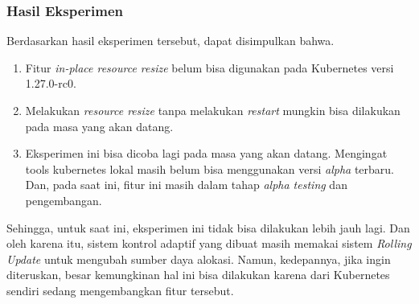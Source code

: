 \subsubsection{Hasil Eksperimen}

Berdasarkan hasil eksperimen tersebut, dapat disimpulkan bahwa.

\begin{enumerate}
    \item Fitur \textit{in-place resource resize} belum bisa digunakan pada Kubernetes versi 1.27.0-rc0.
    \item Melakukan \textit{resource resize} tanpa melakukan \textit{restart} mungkin bisa dilakukan pada masa yang akan datang.
    \item Eksperimen ini bisa dicoba lagi pada masa yang akan datang. Mengingat tools kubernetes lokal masih belum bisa menggunakan versi \textit{alpha} terbaru. Dan, pada saat ini, fitur ini masih dalam tahap \textit{alpha testing} dan pengembangan.
\end{enumerate}

Sehingga, untuk saat ini, eksperimen ini tidak bisa dilakukan lebih jauh lagi. Dan oleh karena itu, sistem kontrol adaptif yang dibuat masih memakai sistem \textit{Rolling Update} untuk mengubah sumber daya alokasi. Namun, kedepannya, jika ingin diteruskan, besar kemungkinan hal ini bisa dilakukan karena dari Kubernetes sendiri sedang mengembangkan fitur tersebut.